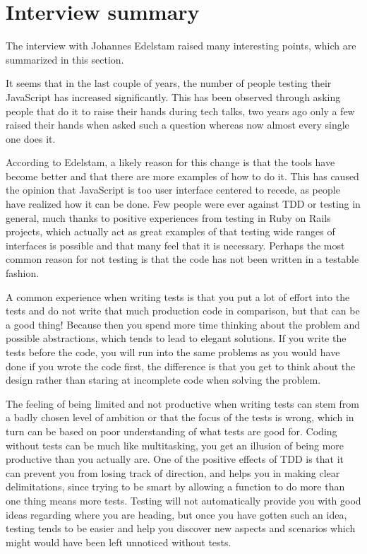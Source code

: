 \documentclass[11pt]{article}
\begin{document}
\section{Interview summary}

The interview with Johannes Edelstam raised many interesting points, which are summarized in this section.

It seems that in the last couple of years, the number of people testing their JavaScript has increased significantly\cite[question~1]{Edelstam}. This has been observed through asking people that do it to raise their hands during tech talks, two years ago only a few raised their hands when asked such a question whereas now almost every single one does it.

According to Edelstam, a likely reason for this change is that the tools have become better and that there are more examples of how to do it. This has caused the opinion that JavaScript is too user interface centered to recede, as people have realized how it can be done. Few people were ever against TDD or testing in general, much thanks to positive experiences from testing in Ruby on Rails projects, which actually act as great examples of that testing wide ranges of interfaces is possible and that many feel that it is necessary. Perhaps the most common reason for not testing is that the code has not been written in a testable fashion. \cite[questions~2-3]{Edelstam}

A common experience when writing tests is that you put a lot of effort into the tests and do not write that much production code in comparison, but that can be a good thing! Because then you spend more time thinking about the problem and possible abstractions, which tends to lead to elegant solutions. If you write the tests before the code, you will run into the same problems as you would have done if you wrote the code first, the difference is that you get to think about the design rather than staring at incomplete code when solving the problem. \cite[question~8]{Edelstam}

The feeling of being limited and not productive when writing tests can stem from a badly chosen level of ambition or that the focus of the tests is wrong, which in turn can be based on poor understanding of what tests are good for. Coding without tests can be much like multitasking, you get an illusion of being more productive than you actually are. One of the positive effects of TDD is that it can prevent you from losing track of direction, and helps you in making clear delimitations, since trying to be smart by allowing a function to do more than one thing means more tests. Testing will not automatically provide you with good ideas regarding where you are heading, but once you have gotten such an idea, testing tends to be easier and help you discover new aspects and scenarios which might would have been left unnoticed without tests. \cite[question~8]{Edelstam}
\end{document}
